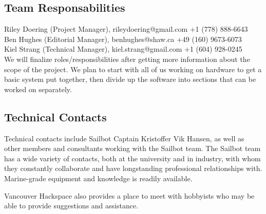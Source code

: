 \subsection{\label{sec:responsabilities:team}Team Responsabilities}
Riley Doering (Project Manager), rileydoering@gmail.com +1 (778) 888-6643\\
Ben Hughes (Editorial Manager), benhughes@shaw.ca +49 (160) 9673-6073\\
Kiel Strang (Technical Manager), kiel.strang@gmail.com +1 (604) 928-0245\\

We will finalize roles/responsibilities after getting more information about the scope of the project.  We plan to start with all of us working on hardware to get a basic system put together, then divide up the software into sections that can be worked on separately.

\subsection{\label{sec:responsabilities:technical-contacts}Technical Contacts}
Technical contacts include Sailbot Captain Kristoffer Vik Hansen, as well as other members and consultants working with the Sailbot team. The Sailbot team has a wide variety of contacts, both at the university and in industry, with whom they constantly collaborate and have longstanding professional relationships with. Marine-grade equipment and knowledge is readily available.

Vancouver Hackspace also provides a place to meet with hobbyists who may be able to provide suggestions and assistance.
